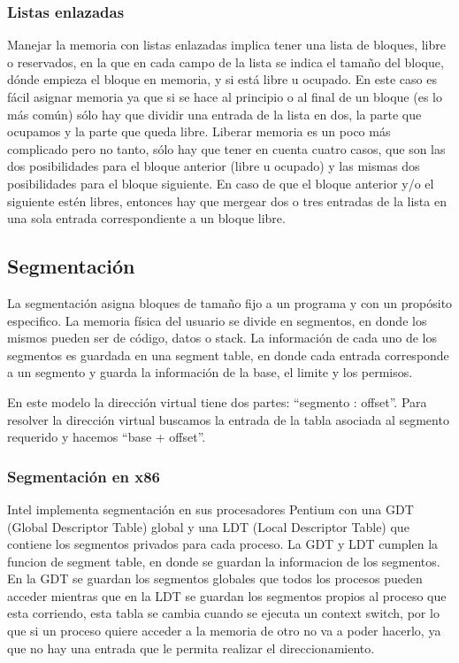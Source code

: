 \documentclass{article}
\begin{document}
\subsubsection{Listas enlazadas}
Manejar la memoria con listas enlazadas implica tener una lista de bloques, libre o reservados, en la que en cada campo de la lista se indica el tama\~no del bloque, d\'onde empieza el bloque en memoria, y si est\'a libre u ocupado. En este caso es f\'acil asignar memoria ya que si se hace al principio o al final de un bloque (es lo m\'as com\'un) s\'olo hay que dividir una entrada de la lista en dos, la parte que ocupamos y la parte que queda libre. Liberar memoria es un poco m\'as complicado pero no tanto, s\'olo hay que tener en cuenta cuatro casos, que son las dos posibilidades para el bloque anterior (libre u ocupado) y las mismas dos posibilidades para el bloque siguiente. En caso de que el bloque anterior y/o el siguiente est\'en libres, entonces hay que mergear dos o tres entradas de la lista en una sola entrada correspondiente a un bloque libre.

\subsection{Segmentaci\'on}

La segmentación asigna bloques de tamaño fijo a un programa y con un propósito especifico. La memoria física del usuario se divide en segmentos, en donde los mismos pueden ser de código, datos o stack. La información de cada uno de los segmentos es guardada en una segment table, en donde cada entrada corresponde a un segmento y guarda la información de la base, el limite y los permisos.

En este modelo la dirección virtual tiene dos partes: ``segmento : offset''. Para resolver la dirección virtual buscamos la entrada de la tabla asociada al segmento requerido y hacemos ``base + offset''.

\subsubsection{Segmentación en x86}
Intel implementa segmentaci\'on en sus procesadores Pentium con una GDT (Global Descriptor Table) global y una LDT (Local Descriptor Table) que contiene los segmentos privados para cada proceso. La GDT y LDT cumplen la funcion de segment table, en donde se guardan la informacion de los segmentos. En la GDT se guardan los segmentos globales que todos los procesos pueden acceder mientras que en la LDT se guardan los segmentos propios al proceso que esta corriendo, esta tabla se cambia cuando se ejecuta un context switch, por lo que si un proceso quiere acceder a la memoria de otro no va a poder hacerlo, ya que no hay una entrada que le permita realizar el direccionamiento.
\end{document}
